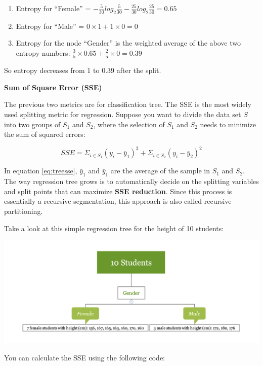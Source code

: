 \documentclass[12pt,]{krantz}
\providecommand{\tightlist}{%
  \setlength{\itemsep}{0pt}\setlength{\parskip}{0pt}}
\theoremstyle{definition}
\theoremstyle{definition}
\theoremstyle{definition}
\theoremstyle{remark}
\begin{document}
\begin{enumerate}
\def\labelenumi{\arabic{enumi}.}
\tightlist
\item
  Entropy for ``Female'' =
  \(-\frac{5}{30}log_{2}\frac{5}{30}-\frac{25}{30}log_{2}\frac{25}{30}=0.65\)
\item
  Entropy for ``Male'' = \(0\times1+1\times 0=0\)
\item
  Entropy for the node ``Gender'' is the weighted average of the above
  two entropy numbers:
  \(\frac{3}{5}\times 0.65+\frac{2}{5}\times 0=0.39\)
\end{enumerate}

So entropy decreases from 1 to 0.39 after the split.

\textbf{Sum of Square Error (SSE)}

The previous two metrics are for classification tree. The SSE is the
most widely used splitting metric for regression. Suppose you want to
divide the data set \(S\) into two groups of \(S_{1}\) and \(S_{2}\),
where the selection of \(S_{1}\) and \(S_{2}\) needs to minimize the sum
of squared errors:

\begin{equation}
SSE=\Sigma_{i\in S_{1}}(y_{i}-\bar{y}_{1})^{2}+\Sigma_{i\in S_{2}}(y_{i}-\bar{y}_{2})^{2}
\label{eq:treesse}
\end{equation}

In equation \eqref{eq:treesse}, \(\bar{y}_{1}\) and \(\bar{y}_{1}\) are
the average of the sample in \(S_{1}\) and \(S_{2}\). The way regression
tree grows is to automatically decide on the splitting variables and
split points that can maximize \textbf{SSE reduction}. Since this
process is essentially a recursive segmentation, this approach is also
called recursive partitioning.

Take a look at this simple regression tree for the height of 10
students:

\includegraphics{images/varEN.png}

You can calculate the SSE using the following code:
\end{document}
